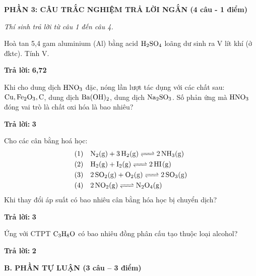 \documentclass[11pt,a4paper]{article}
\begin{document}
\vspace{6pt}
{\large\bfseries\color{mainGreen} PHẦN 3: CÂU TRẮC NGHIỆM TRẢ LỜI NGẮN (4 câu - 1 điểm)}

\textit{Thí sinh trả lời từ câu 1 đến câu 4.}
\vspace{4pt}
\begin{ex}
Hoà tan 5,4 gam aluminium (Al) bằng acid $\ce{H2SO4}$ loãng dư sinh ra V lít khí (ở đktc). Tính V.
\par\textbf{Trả lời:} \textbf{\color{hfRed}6,72}
\end{ex}
\begin{ex}
Khi cho dung dịch $\ce{HNO3}$ đặc, nóng lần lượt tác dụng với các chất sau: $\ce{Cu}, \ce{Fe2O3}, \ce{C}$, dung dịch $\ce{Ba(OH)2}$, dung dịch $\ce{Na2SO3}$. Số phản ứng mà $\ce{HNO3}$ đóng vai trò là chất oxi hóa là bao nhiêu?
\par\textbf{Trả lời:} \textbf{\color{hfRed}3}
\end{ex}
\begin{ex}
Cho các cân bằng hoá học:
\begin{align*}
(1) &\quad \ce{N2(g) + 3H2(g) <=> 2NH3(g)} \\
(2) &\quad \ce{H2(g) + I2(g) <=> 2HI(g)} \\
(3) &\quad \ce{2SO2(g) + O2(g) <=> 2SO3(g)} \\
(4) &\quad \ce{2NO2(g) <=> N2O4(g)}
\end{align*}
Khi thay đổi áp suất có bao nhiêu cân bằng hóa học bị chuyển dịch?
\par\textbf{Trả lời:} \textbf{\color{hfRed}3}
\end{ex}
\begin{ex}
Ứng với CTPT $\ce{C3H8O}$ có bao nhiêu đồng phân cấu tạo thuộc loại alcohol?
\par\textbf{Trả lời:} \textbf{\color{hfRed}2}
\end{ex}

\vspace{6pt}
{\large\bfseries\color{mainGreen} B. PHẦN TỰ LUẬN (3 câu -- 3 điểm)}
\end{document}

